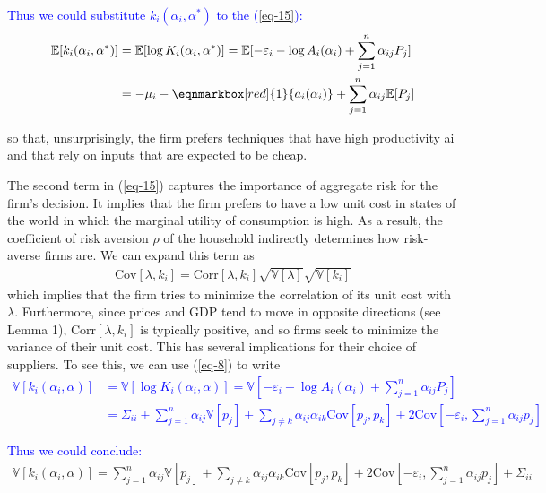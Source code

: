 \documentclass[11pt]{article}
\theoremstyle{definition}
\begin{document}
	\textcolor{blue}{Thus we could substitute $k_i(\alpha_i,\alpha^*)$ to the (\ref{eq-15}):}
	\textcolor{blue}{\begin{align*}
		 \mathbb{E}[k_i(\alpha_i,\alpha^*)] &= \mathbb{E}[\log K_i(\alpha_i,\alpha^*)] = \mathbb{E}[-\varepsilon_i - \log A_i(\alpha_i) + \sum\limits_{j=1}^n \alpha_{ij} P_j] \\
		& = -\mu_i - \eqnmarkbox[red]{1}{a_i(\alpha_i)} +  \sum\limits_{j=1}^n \alpha_{ij} \mathbb{E}[P_j] 
	\end{align*}}
	
	so that, unsurprisingly, the firm prefers techniques that have high productivity ai and that rely on inputs that are expected to be cheap.
	
	The second term in (\ref{eq-15}) captures the importance of aggregate risk for the firm’s decision. It implies that the firm prefers to have a low unit cost in states of the world in which the marginal utility of consumption is high. As a result, the coefficient of risk aversion $\rho$ of the household indirectly determines how risk-averse firms are. We can expand this term as
	\begin{align*}
		\text{Cov}[\lambda,k_i] = \text{Corr}[\lambda, k_i]\sqrt{\mathbb{V}[\lambda]}\sqrt{\mathbb{V}[k_i]}
	\end{align*}
	which implies that the firm tries to minimize the correlation of its unit cost with $\lambda$. Furthermore, since prices and GDP tend to move in opposite directions (see Lemma 1), $\text{Corr}[\lambda, k_i]$ is typically positive, and so firms seek to minimize the variance of their unit cost. This has several implications for their choice of suppliers. To see this, we can use (\ref{eq-8}) to write
	\textcolor{blue}{\begin{align*}
		\mathbb{V}[k_i(\alpha_i,\alpha)] &= \mathbb{V}[\log K_i(\alpha_i,\alpha)] = \mathbb{V}[-\varepsilon_i - \log A_i(\alpha_i) + \sum\limits_{j=1}^n \alpha_{ij} P_j] \\
		& = \Sigma_{ii} + \sum\limits_{j=1}^n \alpha_{ij} \mathbb{V}[p_j] + \sum\limits_{j\neq k} \alpha_{ij}\alpha_{ik} \text{Cov}[p_j,p_k] + 2\text{Cov}\left[-\varepsilon_i,\sum\limits_{j=1}^n \alpha_{ij}p_j \right] 
	\end{align*}}
	
	\textcolor{blue}{Thus we could conclude:}
	\begin{align}
		\mathbb{V}[k_i(\alpha_i,\alpha)] = \sum\limits_{j=1}^n \alpha_{ij} \mathbb{V}[p_j] + \sum\limits_{j\neq k} \alpha_{ij}\alpha_{ik} \text{Cov}[p_j,p_k] + 2\text{Cov}\left[-\varepsilon_i,\sum\limits_{j=1}^n \alpha_{ij}p_j \right]  +  \Sigma_{ii} \label{eq-16}
	\end{align}
	
\end{document}
